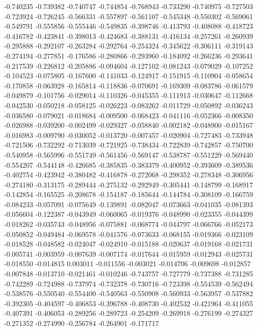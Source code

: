 -0.740235
-0.739382
-0.740747
-0.744854
-0.768943
-0.733290
-0.740975
-0.727503
-0.723924
-0.726245
-0.566331
-0.557897
-0.561107
-0.545348
-0.550302
-0.569061
-0.549791
-0.555856
-0.555446
-0.549835
-0.398746
-0.413793
-0.408088
-0.418723
-0.416782
-0.423841
-0.398013
-0.424683
-0.388131
-0.416134
-0.257261
-0.260939
-0.295888
-0.292107
-0.263284
-0.292764
-0.254324
-0.345622
-0.306111
-0.319143
-0.274194
-0.277851
-0.176586
-0.280866
-0.293960
-0.184092
-0.266236
-0.293641
-0.217539
-0.226812
-0.205886
-0.094604
-0.127102
-0.081243
-0.079029
-0.107252
-0.104523
-0.075805
-0.167600
-0.141033
-0.124917
-0.151915
-0.110904
-0.058654
-0.170858
-0.063928
-0.165814
-0.118836
-0.070691
-0.169309
-0.083786
-0.061579
-0.049879
-0.101756
-0.029014
-0.110326
-0.045355
-0.111913
-0.030647
-0.112668
-0.042530
-0.050218
-0.058125
-0.026223
-0.083262
-0.011729
-0.050892
-0.036243
-0.036580
-0.079021
-0.018684
-0.009500
-0.068423
-0.041116
-0.052366
-0.008350
-0.026988
-0.039200
-0.002499
-0.029327
-0.058840
-0.002182
-0.048900
-0.015167
-0.016983
-0.009790
-0.030052
-0.013720
-0.007457
-0.020904
-0.727483
-0.733948
-0.721506
-0.732292
-0.713039
-0.721925
-0.738434
-0.722839
-0.742857
-0.750700
-0.540958
-0.565996
-0.551749
-0.561456
-0.569147
-0.538787
-0.551229
-0.569440
-0.554207
-0.544148
-0.426685
-0.385835
-0.383379
-0.400952
-0.393609
-0.389536
-0.402754
-0.423942
-0.380482
-0.416878
-0.272068
-0.298352
-0.278348
-0.306956
-0.274180
-0.313175
-0.289444
-0.275132
-0.292949
-0.305441
-0.148799
-0.168917
-0.142854
-0.165525
-0.208678
-0.154187
-0.185644
-0.144784
-0.308109
-0.166759
-0.084233
-0.057091
-0.075649
-0.139891
-0.082047
-0.073663
-0.041035
-0.081393
-0.056604
-0.122387
-0.043949
-0.060065
-0.019376
-0.048990
-0.023355
-0.044399
-0.018262
-0.035743
-0.048956
-0.075881
-0.068774
-0.044797
-0.066766
-0.052173
-0.050852
-0.049484
-0.069578
-0.041576
-0.073633
-0.068155
-0.019366
-0.023109
-0.018528
-0.048582
-0.024047
-0.024910
-0.015188
-0.020637
-0.019168
-0.021731
-0.005741
-0.003959
-0.007639
-0.007174
-0.017644
-0.015959
-0.012943
-0.025731
-0.018550
-0.014815
0.003011
-0.011556
-0.003021
-0.014706
-0.009698
-0.012857
-0.007848
-0.013710
-0.021461
-0.010246
-0.743757
-0.727779
-0.737388
-0.731285
-0.742289
-0.724988
-0.737974
-0.732378
-0.730716
-0.723398
-0.554539
-0.562494
-0.538576
-0.550540
-0.554400
-0.540563
-0.550908
-0.560933
-0.563957
-0.537882
-0.392305
-0.404597
-0.406853
-0.396788
-0.408730
-0.402532
-0.421964
-0.411055
-0.407391
-0.406053
-0.289256
-0.289723
-0.254209
-0.269918
-0.276199
-0.274327
-0.271352
-0.274990
-0.256784
-0.264901
-0.171717
